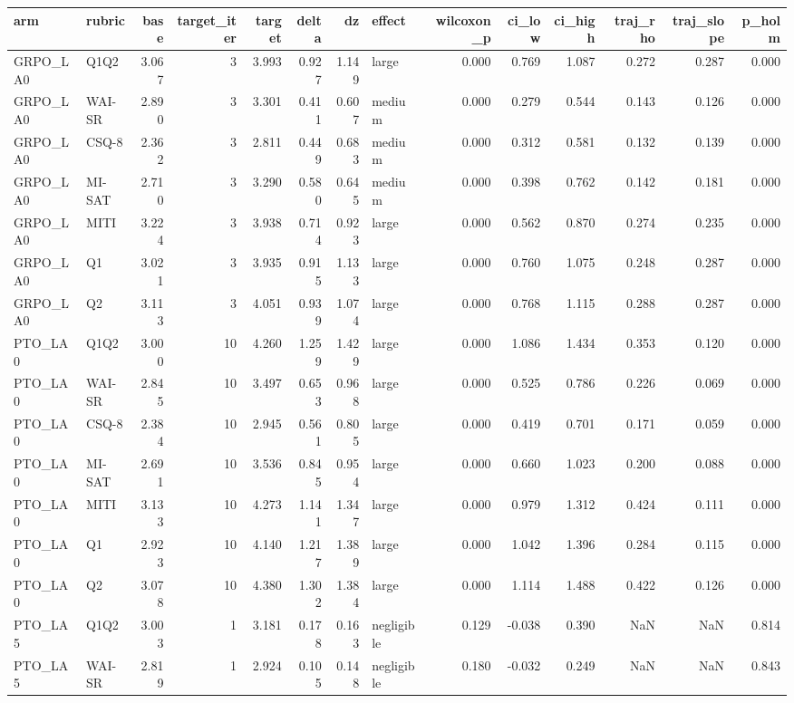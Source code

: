 \begin{tabular}{llrrrrrlrrrrrr}
\toprule
arm & rubric & base & target\_iter & target & delta & dz & effect & wilcoxon\_p & ci\_low & ci\_high & traj\_rho & traj\_slope & p\_holm \\
\midrule
GRPO\_LA0 & Q1Q2 & 3.067 & 3 & 3.993 & 0.927 & 1.149 & large & 0.000 & 0.769 & 1.087 & 0.272 & 0.287 & 0.000 \\
GRPO\_LA0 & WAI-SR & 2.890 & 3 & 3.301 & 0.411 & 0.607 & medium & 0.000 & 0.279 & 0.544 & 0.143 & 0.126 & 0.000 \\
GRPO\_LA0 & CSQ-8 & 2.362 & 3 & 2.811 & 0.449 & 0.683 & medium & 0.000 & 0.312 & 0.581 & 0.132 & 0.139 & 0.000 \\
GRPO\_LA0 & MI-SAT & 2.710 & 3 & 3.290 & 0.580 & 0.645 & medium & 0.000 & 0.398 & 0.762 & 0.142 & 0.181 & 0.000 \\
GRPO\_LA0 & MITI & 3.224 & 3 & 3.938 & 0.714 & 0.923 & large & 0.000 & 0.562 & 0.870 & 0.274 & 0.235 & 0.000 \\
GRPO\_LA0 & Q1 & 3.021 & 3 & 3.935 & 0.915 & 1.133 & large & 0.000 & 0.760 & 1.075 & 0.248 & 0.287 & 0.000 \\
GRPO\_LA0 & Q2 & 3.113 & 3 & 4.051 & 0.939 & 1.074 & large & 0.000 & 0.768 & 1.115 & 0.288 & 0.287 & 0.000 \\
PTO\_LA0 & Q1Q2 & 3.000 & 10 & 4.260 & 1.259 & 1.429 & large & 0.000 & 1.086 & 1.434 & 0.353 & 0.120 & 0.000 \\
PTO\_LA0 & WAI-SR & 2.845 & 10 & 3.497 & 0.653 & 0.968 & large & 0.000 & 0.525 & 0.786 & 0.226 & 0.069 & 0.000 \\
PTO\_LA0 & CSQ-8 & 2.384 & 10 & 2.945 & 0.561 & 0.805 & large & 0.000 & 0.419 & 0.701 & 0.171 & 0.059 & 0.000 \\
PTO\_LA0 & MI-SAT & 2.691 & 10 & 3.536 & 0.845 & 0.954 & large & 0.000 & 0.660 & 1.023 & 0.200 & 0.088 & 0.000 \\
PTO\_LA0 & MITI & 3.133 & 10 & 4.273 & 1.141 & 1.347 & large & 0.000 & 0.979 & 1.312 & 0.424 & 0.111 & 0.000 \\
PTO\_LA0 & Q1 & 2.923 & 10 & 4.140 & 1.217 & 1.389 & large & 0.000 & 1.042 & 1.396 & 0.284 & 0.115 & 0.000 \\
PTO\_LA0 & Q2 & 3.078 & 10 & 4.380 & 1.302 & 1.384 & large & 0.000 & 1.114 & 1.488 & 0.422 & 0.126 & 0.000 \\
PTO\_LA5 & Q1Q2 & 3.003 & 1 & 3.181 & 0.178 & 0.163 & negligible & 0.129 & -0.038 & 0.390 & NaN & NaN & 0.814 \\
PTO\_LA5 & WAI-SR & 2.819 & 1 & 2.924 & 0.105 & 0.148 & negligible & 0.180 & -0.032 & 0.249 & NaN & NaN & 0.843 \\

\end{tabular}
